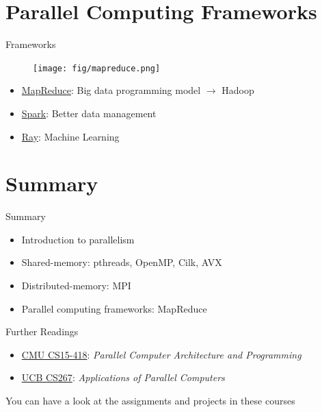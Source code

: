 \documentclass{../TexTemplate/myslide}
\begin{document}
\section{Parallel Computing Frameworks}
\begin{frame}
\sectionpage
\end{frame}

\begin{frame}{Frameworks}
\begin{figure}
\centering
\texttt{[image: fig/mapreduce.png]}
\end{figure}
\begin{itemize}
\item \href{https://www.tutorialspoint.com/hadoop/hadoop_mapreduce.htm}{MapReduce}: Big data programming model $\to$ Hadoop
\item \href{https://spark.apache.org}{Spark}: Better data management
\item \href{https://rise.cs.berkeley.edu/projects/ray/}{Ray}: Machine Learning
\end{itemize}
\end{frame}

\section{Summary}
\begin{frame}
\sectionpage
\end{frame}

\begin{frame}{Summary}
\begin{itemize}
	\item Introduction to parallelism
	\item Shared-memory: pthreads, OpenMP, Cilk, AVX
	\item Distributed-memory: MPI
	\item Parallel computing frameworks: MapReduce
\end{itemize}
\end{frame}

\begin{frame}{Further Readings}
\begin{itemize}
	\item \href{http://www.cs.cmu.edu/~418/}{CMU CS15-418}: \emph{Parallel Computer Architecture and Programming}
	\item \href{https://sites.google.com/lbl.gov/cs267-spr2020/}{UCB CS267}: \emph{Applications of Parallel Computers}
\end{itemize}
You can have a look at the assignments and projects in these courses
\end{frame}
\end{document}
